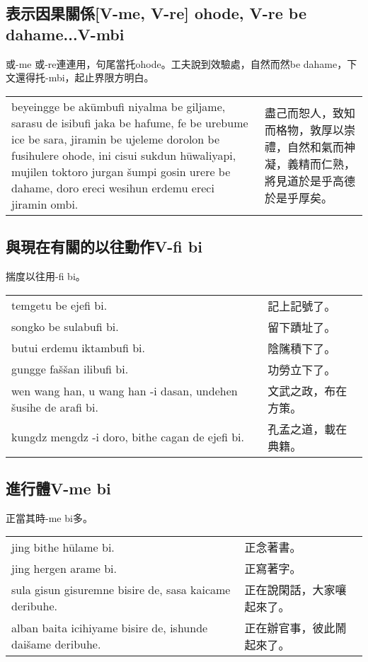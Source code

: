 \documentclass{article}
\begin{document}
\subsection{表示因果關係[V-me, V-re] ohode, V-re be dahame...V-mbi}
\noindent 或-me 或-re連連用，句尾當托ohode。工夫說到效驗處，自然而然be dahame，下文還得托-mbi，起止界限方明白。
\begin{center}
    \begin{tabularx}{\textwidth}{XX}
        beyeingge be ak\={u}mbufi niyalma be giljame, sarasu de isibufi jaka be hafume, fe be urebume ice be sara, jiramin be ujeleme dorolon be fusihulere ohode, ini cisui sukdun h\={u}waliyapi, mujilen toktoro jurgan \v{s}umpi gosin urere be dahame, doro ereci wesihun erdemu ereci jiramin ombi. & 盡己而恕人，致知而格物，敦厚以崇禮，自然和氣而神凝，義精而仁熟，將見道於是乎高德於是乎厚矣。
    \end{tabularx}
\end{center}

\subsection{與現在有關的以往動作V-fi bi}
\noindent 揣度以往用-fi bi。
\begin{center}
    \begin{tabularx}{\textwidth}{XX}
        temgetu be ejefi bi. & 記上記號了。\\
        songko be sulabufi bi. & 留下蹟址了。\\
        butui erdemu iktambufi bi. & 陰隲積下了。\\
        gungge fa\v{s}\v{s}an ilibufi bi. & 功勞立下了。\\
        wen wang han, u wang han -i dasan, undehen \v{s}usihe de arafi bi. & 文武之政，布在方策。\\
        kungdz mengdz -i doro, bithe cagan de ejefi bi. & 孔孟之道，載在典籍。
    \end{tabularx}
\end{center}

\subsection{進行體V-me bi}
\noindent 正當其時-me bi多。
\begin{center}
    \begin{tabularx}{\textwidth}{XX}
        jing bithe h\={u}lame bi. & 正念著書。\\
        jing hergen arame bi. & 正寫著字。\\
        sula gisun gisuremne bisire de, sasa kaicame deribuhe. & 正在說閑話，大家嚷起來了。\\
        alban baita icihiyame bisire de, ishunde dai\v{s}ame deribuhe. & 正在辦官事，彼此鬧起來了。
    \end{tabularx}
\end{center}
\end{document}
